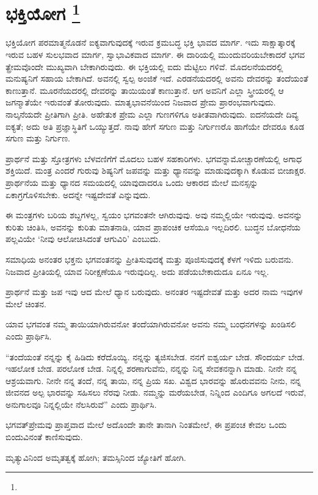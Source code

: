 
\chapter[ಭಕ್ತಿಯೋಗ ]{ಭಕ್ತಿಯೋಗ \protect\footnote{}}

ಭಕ್ತಿಯೋಗ ಪರಮಾತ್ಮನೊಡನೆ ಐಕ್ಯವಾಗುವುದಕ್ಕೆ ಇರುವ ಕ್ರಮಬದ್ಧ ಭಕ್ತಿ ಭಾವದ ಮಾರ್ಗ. ಇದು ಸಾಕ್ಷಾತ್ಕಾರಕ್ಕೆ ಇರುವ ಬಹಳ ಸುಲಭವಾದ ಮಾರ್ಗ, ಸ್ವಾಭಾವಿಕವಾದ ಮಾರ್ಗ. ಈ ದಾರಿಯಲ್ಲಿ ಮುಂದುವರಿಯಬೇಕಾದರೆ ಭಗವ ತ್ಪ್ರೇಮವೊಂದೇ ಮುಖ್ಯವಾಗಿ ಬೇಕಾಗಿರುವುದು. ಈ ಭಕ್ತಿಯಲ್ಲಿ ಐದು ಮೆಟ್ಟಿಲು ಗಳಿವೆ. ಮೊದಲನೆಯದರಲ್ಲಿ ಮನುಷ್ಯನಿಗೆ ಸಹಾಯ ಬೇಕಾಗಿದೆ. ಅವನಲ್ಲಿ ಸ್ವಲ್ಪ ಅಂಜಿಕೆ ಇದೆ. ಎರಡನೆಯದರಲ್ಲಿ ಅವನು ದೇವರನ್ನು ತಂದೆಯಂತೆ ಕಾಣುತ್ತಾನೆ. ಮೂರನೆಯದರಲ್ಲಿ ದೇವರನ್ನು ತಾಯಿಯಂತೆ ಕಾಣುತ್ತಾನೆ. ಆಗ ಅವನಿಗೆ ಎಲ್ಲಾ ಸ್ತ್ರೀಯರಲ್ಲಿ ಆ ಜಗನ್ಮಾತೆಯೇ ಇರುವಂತೆ ತೋರುವುದು. ಮಾತೃಭಾವನೆಯಿಂದ ನಿಜವಾದ ಪ್ರೇಮ ಪ್ರಾರಂಭವಾಗುವುದು. ನಾಲ್ಕನೆಯದೇ ಪ್ರೀತಿಗಾಗಿ ಪ್ರೀತಿ. ಅಹೇತುಕ ಪ್ರೇಮ ಎಲ್ಲಾ ಗುಣಗಳಿಗೂ ಅತೀತವಾಗಿರುವುದು. ಐದನೆಯದೇ ದಿವ್ಯ ಐಕ್ಯತೆ; ಅದು ಅತಿ ಪ್ರಜ್ಞಾಸ್ಥಿತಿಗೆ ಒಯ್ಯುತ್ತದೆ. ನಾವು ಹೇಗೆ ಸಗುಣ ಮತ್ತು ನಿರ್ಗುಣರೊ ಹಾಗೆಯೇ ದೇವರೂ ಕೂಡ ಸಗುಣ ಮತ್ತು ನಿರ್ಗುಣ.

ಪ್ರಾರ್ಥನೆ ಮತ್ತು ಸ್ತೋತ್ರಗಳು ಬೆಳವಣಿಗೆಗೆ ಮೊದಲು ಬಹಳ ಸಹಕಾರಿಗಳು. ಭಗವನ್ನಾಮೋಚ್ಚಾರಣೆಯಲ್ಲಿ ಅಗಾಧ ಶಕ್ತಿಯಿದೆ. ಮಂತ್ರ ಎಂದರೆ ಗುರುವು ಶಿಷ್ಯನಿಗೆ ಜಪವನ್ನು ಮತ್ತು ಧ್ಯಾನವನ್ನು ಮಾಡುವುದಕ್ಕಾಗಿ ಕೊಡುವ ಬೀಜಾಕ್ಷರ. ಪ್ರಾರ್ಥನೆಯ ಮತ್ತು ಧ್ಯಾನದ ಸಮಯದಲ್ಲಿ ಯಾವುದಾದರೂ ಒಂದು ಆಕಾರದ ಮೇಲೆ ಮನಸ್ಸನ್ನು ಏಕಾಗ್ರಗೊಳಿಸಬೇಕು. ಅದನ್ನೇ ಇಷ್ಟದೇವತೆ ಎನ್ನುವುದು.

ಈ ಮಂತ್ರಗಳು ಬರಿಯ ಶಬ್ದಗಳಲ್ಲ, ಸ್ವಯಂ ಭಗವಂತನೇ ಆಗಿರುವುವು. ಅವು ನಮ್ಮಲ್ಲಿಯೇ ಇರುವುವು. ಅವನನ್ನು ಕುರಿತು ಚಿಂತಿಸಿ, ಅವನನ್ನು ಕುರಿತು ಮಾತನಾಡಿ, ಯಾವ ಪ್ರಾಪಂಚಿಕ ಆಸೆಯೂ ಇಲ್ಲದಿರಲಿ. ಬುದ್ಧನ ಬೋಧನೆಯ ಪಲ್ಲವಿಯೇ ‘ನೀವು ಆಲೋಚಿಸಿದಂತೆ ಆಗುವಿರಿ’ ಎಂಬುದು.

ಸಮಾಧಿಯ ಅನಂತರ ಭಕ್ತನು ಭಗವಂತನನ್ನು ಪ್ರೀತಿಸುವುದಕ್ಕೆ ಮತ್ತು ಪೂಜಿಸುವುದಕ್ಕೆ ಕೆಳಗೆ ಇಳಿದು ಬರುವನು. ನಿಜವಾದ ಪ್ರೀತಿಯಲ್ಲಿ ಯಾವ ನಿರೀಕ್ಷಣೆಯೂ ಇರುವುದಿಲ್ಲ. ಅದು ಪಡೆಯಬೇಕಾದುದೂ ಏನೂ ಇಲ್ಲ.

ಪ್ರಾರ್ಥನೆ ಮತ್ತು ಜಪ ಇವು ಆದ ಮೇಲೆ ಧ್ಯಾನ ಬರುವುದು. ಅನಂತರ ಇಷ್ಟದೇವತೆ ಮತ್ತು ಅದರ ನಾಮ ಇವುಗಳ ಮೇಲೆ ಚಿಂತನ.

ಯಾವ ಭಗವಂತ ನಮ್ಮ ತಾಯಿಯಾಗಿರುವನೋ ತಂದೆಯಾಗಿರುವನೋ ಅವನು ನಮ್ಮ ಬಂಧನಗಳನ್ನು ಖಂಡಿಸಲಿ ಎಂದು ಪ್ರಾರ್ಥಿಸಿ.

“ತಂದೆಯಂತೆ ನನ್ನನ್ನು ಕೈ ಹಿಡಿದು ಕರೆದೊಯ್ಯಿ. ನನ್ನನ್ನು ತ್ಯಜಿಸಬೇಡ. ನನಗೆ ಐಶ್ವರ್ಯ ಬೇಡ. ಸೌಂದರ್ಯ ಬೇಡ. ಇಹಲೋಕ ಬೇಡ. ಪರಲೋಕ ಬೇಡ. ನಿನ್ನಲ್ಲಿ ಶರಣಾಗುವೆನು, ನನ್ನನ್ನು ನಿನ್ನ ಸೇವಕನನ್ನಾಗಿ ಮಾಡು. ನೀನೇ ನನ್ನ ಆಶ್ರಯವಾಗು. ನೀನೇ ನನ್ನ ತಂದೆ, ನನ್ನ ತಾಯಿ, ನನ್ನ ಪ್ರಿಯ ಸಖ. ವಿಶ್ವದ ಭಾರವನ್ನು ಹೊರುವವನು ನೀನು, ನನ್ನ ಜೀವನದ ಅಲ್ಪ ಭಾರವನ್ನು ಸಹಿಸಲು ನೆರವು ನೀಡು. ನಮ್ಮನ್ನು ಮರೆಯಬೇಡ, ನಿನ್ನಿಂದ ಎಂದಿಗೂ ಅಗಲದೆ ಇರುವೆ, ಅನುಗಾಲವೂ ನಿನ್ನಲ್ಲಿಯೇ ನೆಲಸಿರುವೆ” ಎಂದು ಪ್ರಾರ್ಥಿಸಿ.

ಭಗವತ್​ಪ್ರೇಮವು ಪ್ರಾಪ್ತವಾದ ಮೇಲೆ ಅದೊಂದೇ ತಾನೇ ತಾನಾಗಿ ನಿಂತಮೇಲೆ, ಈ ಪ್ರಪಂಚ ಕೇವಲ ಒಂದು ಬಿಂದುವಿನಂತೆ ಕಾಣಿಸುವುದು.

ಮೃತ್ಯುವಿನಿಂದ ಅಮೃತತ್ವಕ್ಕೆ ಹೋಗಿ; ತಮಸ್ಸಿನಿಂದ ಜ್ಯೋತಿಗೆ ಹೋಗಿ.

